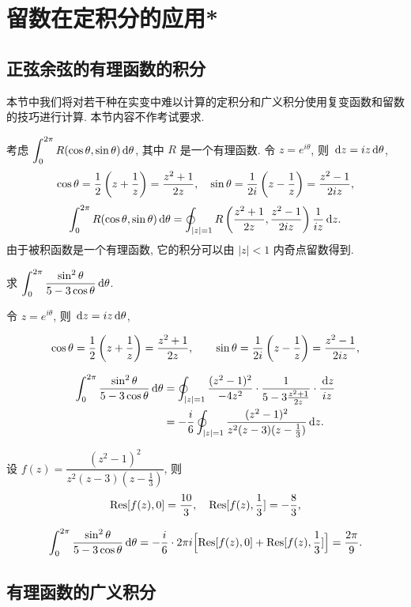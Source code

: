 \documentclass[nocolor,theme=doremi,lang=cn,11pt,chinese,twoside,openright,usesamecnt]{elegantbook}
\begin{document}
\section{留数在定积分的应用*}

\subsection{正弦余弦的有理函数的积分}

本节中我们将对若干种在实变中难以计算的定积分和广义积分使用复变函数和留数的技巧进行计算.
本节内容不作考试要求.

考虑 $\displaystyle\int_0^{2\pi} R(\cos\theta,\sin\theta)\,\mathrm{d}\theta$, 其中 $R$ 是一个有理函数.
令 $z=e^{i\theta}$, 则 $\,\mathrm{d} z=iz\,\mathrm{d}\theta$,
\[\cos\theta=\frac{1}{2}\left(z+\frac1z\right)=\frac{z^2+1}{2z},\quad
\sin\theta=\frac1{2i}\left(z-\frac1z\right)=\frac{z^2-1}{2iz},\]
	\[\int_0^{2\pi} R(\cos\theta,\sin\theta)\,\mathrm{d}\theta
	=\oint_{|z|=1} R\left(\frac{z^2+1}{2z},\frac{z^2-1}{2iz}\right)\frac1{iz}\,\mathrm{d} z.\]
由于被积函数是一个有理函数, 它的积分可以由 $|z|<1$ 内奇点留数得到.

\begin{example}
	求 $\displaystyle\int_0^{2\pi}\frac{\sin^2\theta}{5-3\cos\theta}\,\mathrm{d}\theta$.
\end{example}

\begin{solution}
	令 $z=e^{i\theta}$, 则 $\,\mathrm{d} z=iz\,\mathrm{d}\theta$,
	{
		\[\cos\theta=\frac{1}{2}\left(z+\frac1z\right)=\frac{z^2+1}{2z},\qquad
		\sin\theta=\frac1{2i}\left(z-\frac1z\right)=\frac{z^2-1}{2iz},\]

		\begin{align*}
			\int_0^{2\pi}\frac{\sin^2\theta}{5-3\cos\theta}\,\mathrm{d}\theta
			&=\oint_{|z|=1}\frac{(z^2-1)^2}{-4z^2}\cdot\frac1{5-3\frac{z^2+1}{2z}}\cdot\frac{\,\mathrm{d} z}{iz}\\
			&=-\frac i6\oint_{|z|=1}\frac{(z^2-1)^2}{z^2(z-3)(z-\frac13)}\,\mathrm{d} z.
		\end{align*}
	}
	设 $f(z)=\dfrac{(z^2-1)^2}{z^2(z-3)(z-\frac13)}$,
	{则
		\[{\mathrm{Res}}[f(z),0]=\frac{10}3,\quad{\mathrm{Res}}[f(z),\frac13]=-\frac83,\]
	}

	{
		\[
			\int_0^{2\pi}\frac{\sin^2\theta}{5-3\cos\theta}\,\mathrm{d}\theta
			=-\frac i6\cdot 2\pi i\Bigl[{\mathrm{Res}}[f(z),0]+{\mathrm{Res}}[f(z),\frac13]\Bigr]
			=\frac{2\pi}9.
		\]
	}
\end{solution}

\subsection{有理函数的广义积分}
\end{document}
